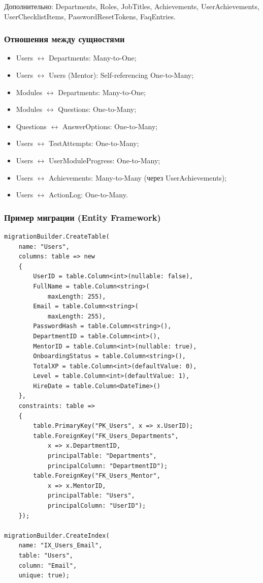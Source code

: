 Дополнительно: Departments, Roles, JobTitles, Achievements, UserAchievements, UserChecklistItems, PasswordResetTokens, FaqEntries.

\subsubsection{Отношения между сущностями}

\begin{itemize}
    \item Users $\leftrightarrow$ Departments: Many-to-One;
    \item Users $\leftrightarrow$ Users (Mentor): Self-referencing One-to-Many;
    \item Modules $\leftrightarrow$ Departments: Many-to-One;
    \item Modules $\leftrightarrow$ Questions: One-to-Many;
    \item Questions $\leftrightarrow$ AnswerOptions: One-to-Many;
    \item Users $\leftrightarrow$ TestAttempts: One-to-Many;
    \item Users $\leftrightarrow$ UserModuleProgress: One-to-Many;
    \item Users $\leftrightarrow$ Achievements: Many-to-Many (через UserAchievements);
    \item Users $\leftrightarrow$ ActionLog: One-to-Many.
\end{itemize}

\subsubsection{Пример миграции (Entity Framework)}

\begin{lstlisting}[basicstyle=\ttfamily\small]
migrationBuilder.CreateTable(
    name: "Users",
    columns: table => new
    {
        UserID = table.Column<int>(nullable: false),
        FullName = table.Column<string>(
            maxLength: 255),
        Email = table.Column<string>(
            maxLength: 255),
        PasswordHash = table.Column<string>(),
        DepartmentID = table.Column<int>(),
        MentorID = table.Column<int>(nullable: true),
        OnboardingStatus = table.Column<string>(),
        TotalXP = table.Column<int>(defaultValue: 0),
        Level = table.Column<int>(defaultValue: 1),
        HireDate = table.Column<DateTime>()
    },
    constraints: table =>
    {
        table.PrimaryKey("PK_Users", x => x.UserID);
        table.ForeignKey("FK_Users_Departments",
            x => x.DepartmentID,
            principalTable: "Departments",
            principalColumn: "DepartmentID");
        table.ForeignKey("FK_Users_Mentor",
            x => x.MentorID,
            principalTable: "Users",
            principalColumn: "UserID");
    });

migrationBuilder.CreateIndex(
    name: "IX_Users_Email",
    table: "Users",
    column: "Email",
    unique: true);
\end{lstlisting}


